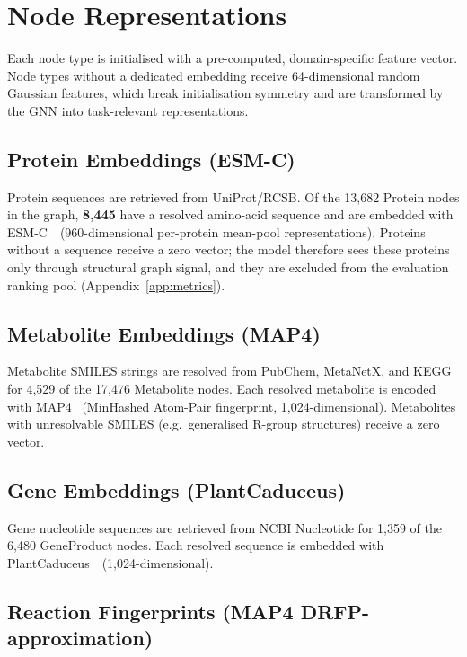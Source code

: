 \section{Node Representations}
\label{app:embeddings}

Each node type is initialised with a pre-computed, domain-specific feature vector.
Node types without a dedicated embedding receive 64-dimensional random Gaussian
features, which break initialisation symmetry and are transformed by the GNN
into task-relevant representations.

\subsection{Protein Embeddings (ESM-C)}

Protein sequences are retrieved from UniProt/RCSB.
Of the 13,682 Protein nodes in the graph, \textbf{8,445} have a resolved
amino-acid sequence and are embedded with
ESM-C~~(960-dimensional per-protein mean-pool representations).
Proteins without a sequence receive a zero vector; the model therefore sees
these proteins only through structural graph signal, and they are excluded from
the evaluation ranking pool (Appendix~\ref{app:metrics}).

\subsection{Metabolite Embeddings (MAP4)}

Metabolite SMILES strings are resolved from PubChem, MetaNetX, and KEGG for
4,529 of the 17,476 Metabolite nodes.
Each resolved metabolite is encoded with MAP4~\cite{Capecchi2020}
(MinHashed Atom-Pair fingerprint, 1,024-dimensional).
Metabolites with unresolvable SMILES (e.g.\ generalised R-group structures)
receive a zero vector.

\subsection{Gene Embeddings (PlantCaduceus)}

Gene nucleotide sequences are retrieved from NCBI Nucleotide for
1,359 of the 6,480 GeneProduct nodes.
Each resolved sequence is embedded with
PlantCaduceus~~(1,024-dimensional).

\subsection{Reaction Fingerprints (MAP4 DRFP-approximation)}
\label{app:drfp}


